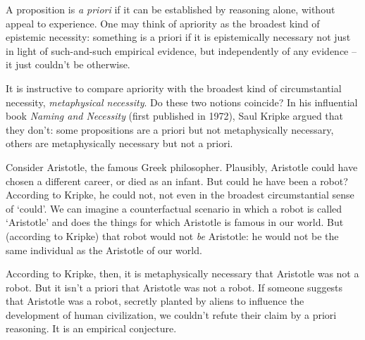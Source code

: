 A proposition is \emph{a priori} if it can be established by reasoning alone, without appeal to experience.
One may think of apriority as the broadest kind of epistemic necessity:
something is a priori if it is epistemically necessary
not just in light of such-and-such empirical evidence,
but independently of any evidence -- it just couldn't be otherwise.

It is instructive to compare apriority with the broadest kind of circumstantial necessity,
\emph{metaphysical necessity}.
Do these two notions coincide?
In his influential book \emph{Naming and Necessity}
(first published in 1972),
Saul Kripke argued that they don't:
some propositions are a priori but not metaphysically necessary,
others are metaphysically necessary but not a priori.

Consider Aristotle,
the famous Greek philosopher.
Plausibly,
Aristotle could have chosen a different career, or died as an infant.
But could he have been a robot?
According to Kripke, he could not,
not even in the broadest circumstantial sense of `could'.
We can imagine a counterfactual scenario in which a robot is called `Aristotle'
and does the things for which Aristotle is famous in our world.
But (according to Kripke) that robot would not \emph{be} Aristotle:
he would not be the same individual as the Aristotle of our world.

According to Kripke, then, it is metaphysically necessary that Aristotle was not a robot.
But it isn't a priori that Aristotle was not a robot.
If someone suggests that Aristotle was a robot,
secretly planted by aliens to influence the development of human civilization,
we couldn't refute their claim by a priori reasoning.
It is an empirical conjecture.


